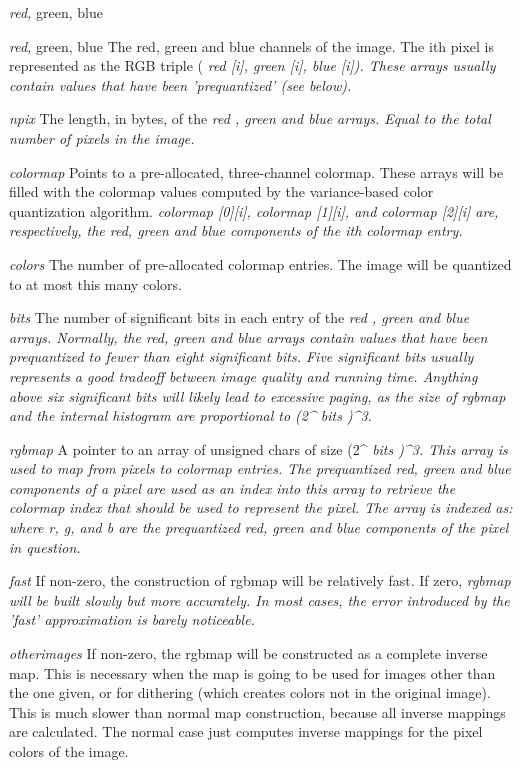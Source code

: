 \begin{TPlist}{{\it red,} green, blue}
\item[{{\it red,} green, blue}]
The red, green and blue channels of the image.  The ith pixel is represented
as the RGB triple (%
\it red%
\rm [i], %
\it green%
\rm [i], %
\it blue%
\rm [i]).  These
arrays usually contain values that have been 'prequantized' (see below).
\item[{{\it npix}}]
The length, in bytes, of the %
\it red%
\rm , %
\it green %
\rm and %
\it blue %
\rm arrays.
Equal to the total number of pixels in the image.
\item[{{\it colormap}}]
Points to a pre-allocated, three-channel colormap.  These arrays will be
filled with the colormap values computed by the variance-based color
quantization algorithm.  %
\it colormap%
\rm [0][i], %
\it colormap%
\rm [1][i], and
%
\it colormap%
\rm [2][i] are, respectively, the red, green and blue components
of the ith colormap entry.
\item[{{\it colors}}]
The number of pre-allocated colormap entries.  The image will be quantized to
at most this many colors.
\item[{{\it bits}}]
The number of significant bits in each entry of the %
\it red%
\rm , %
\it green %
\rm and
%
\it blue %
\rm arrays.  Normally, the red, green and blue arrays contain
values that have been prequantized to fewer than eight
significant bits.
Five significant bits usually represents a good tradeoff between image quality
and running time.  Anything above six significant bits will likely lead to
excessive paging, as the size of %
\it rgbmap %
\rm and the internal histogram are
proportional to (2\^{}%
\it bits%
\rm )\^{}3. 
\item[{{\it rgbmap}}]
A pointer to an array of unsigned chars of size (2\^{}%
\it bits%
\rm )\^{}3.
This array is used
to map from pixels to colormap entries.  The prequantized red, green
and blue components of a pixel are used as an index into this array
to retrieve the colormap index that should be used to represent the
pixel.  The array is indexed as:
where r, g, and b are the prequantized red, green and blue components of
the pixel in question.
\item[{{\it fast}}]
If non-zero, the construction of rgbmap will be relatively fast.  If
zero, %
\it rgbmap %
\rm will be built slowly but more accurately.  In most cases,
the error introduced by the 'fast' approximation is barely noticeable.
\item[{{\it otherimages}}]
If non-zero, the rgbmap will be constructed as a complete inverse map.  This
is necessary when the map is going to be used for images other than the one
given, or for dithering (which creates colors not in the original image).
This is much slower than normal map construction, because all inverse
mappings are calculated.  The normal case just computes inverse mappings for 
the pixel colors of the image.
\end{TPlist}
